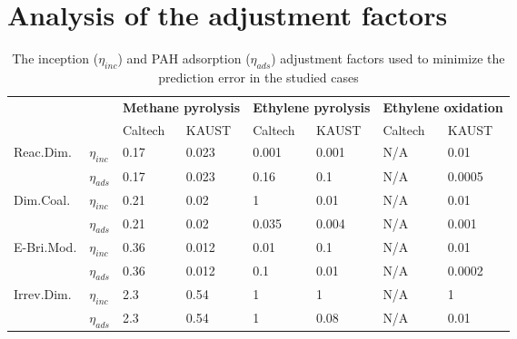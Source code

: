 \section{Analysis of the adjustment factors}



\begin{table}[H]
	\caption{The inception ($\eta_{inc}$) and PAH adsorption ($\eta_{ads}$) adjustment factors used to minimize the prediction error in the studied cases}
	\begin{tabular}{llllllll}
		\cline{3-8}
		&     & \multicolumn{2}{l}{\textbf{Methane pyrolysis}} & \multicolumn{2}{l}{\textbf{Ethylene pyrolysis}} & \multicolumn{2}{l}{\textbf{Ethylene oxidation}} \\
		\cline{3-8}
		&     & Caltech            & KAUST            & Caltech             & KAUST            & Caltech            & KAUST             \\
		\hline
		\multirow{2}{*}{Reac.Dim.}  & $\eta_{inc}$  & 0.17               & 0.023            & 0.001               & 0.001            & N/A                & 0.01              \\
		
		& $\eta_{ads}$  & 0.17               & 0.023            & 0.16                & 0.1              & N/A                & 0.0005            \\
		\hline
		\multirow{2}{*}{Dim.Coal.}  & $\eta_{inc}$  & 0.21               & 0.02             & 1                   & 0.01             & N/A                & 0.01              \\
		
		& $\eta_{ads}$  & 0.21               & 0.02             & 0.035               & 0.004            & N/A                & 0.001             \\
		\hline
		\multirow{2}{*}{E-Bri.Mod.} & $\eta_{inc}$  & 0.36               & 0.012            & 0.01                & 0.1              & N/A                & 0.01              \\
		
		& $\eta_{ads}$  & 0.36               & 0.012            & 0.1                 & 0.01             & N/A                & 0.0002            \\
		\hline
		\multirow{2}{*}{Irrev.Dim.} & $\eta_{inc}$  & 2.3                & 0.54             & 1                   & 1                & N/A                & 1                 \\
		& $\eta_{ads}$  & 2.3                & 0.54             & 1                   & 0.08             & N/A                & 0.01  \\
		\hline
	\end{tabular}
\end{table}